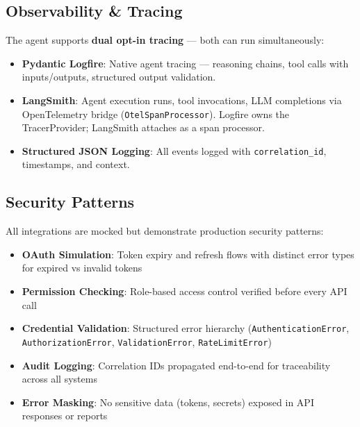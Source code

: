 \documentclass[8pt,a4paper]{article}
\begin{document}
\vspace{-0.1em}
\begin{minipage}[t]{0.48\textwidth}
\vspace{0pt}
\subsection{Observability \& Tracing}
{\scriptsize
The agent supports \textbf{dual opt-in tracing} --- both can run simultaneously:
\begin{itemize}[leftmargin=1.2em]
\item \textbf{Pydantic Logfire}: Native agent tracing --- reasoning chains, tool calls with inputs/outputs, structured output validation.
\item \textbf{LangSmith}: Agent execution runs, tool invocations, LLM completions via OpenTelemetry bridge (\texttt{OtelSpanProcessor}). Logfire owns the TracerProvider; LangSmith attaches as a span processor.
\item \textbf{Structured JSON Logging}: All events logged with \texttt{correlation\_id}, timestamps, and context.
\end{itemize}
}
\end{minipage}
\hfill
\begin{minipage}[t]{0.48\textwidth}
\vspace{0pt}
\subsection{Security Patterns}
{\scriptsize
All integrations are mocked but demonstrate production security patterns:
\begin{itemize}[leftmargin=1.2em]
\item \textbf{OAuth Simulation}: Token expiry and refresh flows with distinct error types for expired vs invalid tokens
\item \textbf{Permission Checking}: Role-based access control verified before every API call
\item \textbf{Credential Validation}: Structured error hierarchy (\texttt{AuthenticationError}, \texttt{AuthorizationError}, \texttt{ValidationError}, \texttt{RateLimitError})
\item \textbf{Audit Logging}: Correlation IDs propagated end-to-end for traceability across all systems
\item \textbf{Error Masking}: No sensitive data (tokens, secrets) exposed in API responses or reports
\end{itemize}
}
\end{minipage}
\end{document}
